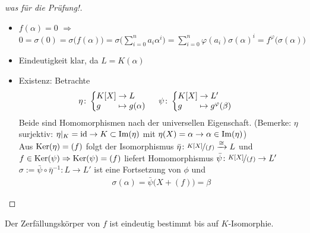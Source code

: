 \begin{proof}[was für die Prüfung!]\leavevmode\vspace*{\dimexpr-\baselineskip+2\lineskip}
	\begin{itemize}
		\item $f(\alpha) = 0$ $\Rightarrow$ $0 = \sigma(0) = \sigma\big(f(\alpha)\big) = \sigma\big(\sum_{i=0}^n a_i \alpha^i\big) = \sum_{i=0}^n \varphi(a_i)\sigma(\alpha)^i = f^{\varphi}\big(\sigma(\alpha)\big)$
		\item Eindeutigkeit klar, da $L=K(\alpha)$
		\item Existenz: Betrachte 
		\begin{align*}
			\eta\colon&
			\left\lbrace\begin{array}{@{}l@{\;}c@{\;}l}
				K[X] &\to& L\\
				g &\mapsto& g(\alpha)
			\end{array}\right.&
			\psi\colon&
			\left\lbrace\begin{array}{@{}l@{\;}c@{\;}l}
				K[X] &\to& L'\\
				g &\mapsto& g^{\varphi}(\beta) 
			\end{array}\right.
		\end{align*}
		Beide sind Homomorphismen nach der universellen Eigenschaft.
		(Bemerke: $\eta$ surjektiv: $\eta|_{K} = \operatorname{id} \to K \subset \operatorname{Im}(\eta)$ mit $\eta(X) = \alpha \to \alpha \in \operatorname{Im}(\eta)$)\\
		Aus $\operatorname{Ker}(\eta)=(f)$ folgt der Isomorphismus $\bar{\eta}\colon \lnkset{K[X]}{(f)} \xrightarrow{\cong}L$ und\\
		$f \in \operatorname{Ker}(\psi) \Rightarrow \operatorname{Ker}(\psi) = (f)$ liefert Homomorphismus $\bar{\psi}\colon \lnkset{K[X]}{(f)} \to L'$\\
		$\sigma:= \bar{\psi}\circ \bar{\eta}^{-1}\colon L \to L'$ ist eine Fortsetzung von $\phi$ und
		\begin{align*}
			\sigma(\alpha) = \bar{\psi}\big(X+(f)\big) = \beta
		\end{align*}
	\end{itemize}
\end{proof}
\begin{proposition}
	Der Zerfällungskörper von $f$ ist eindeutig bestimmt bis auf $K$-Isomorphie.
\end{proposition}
